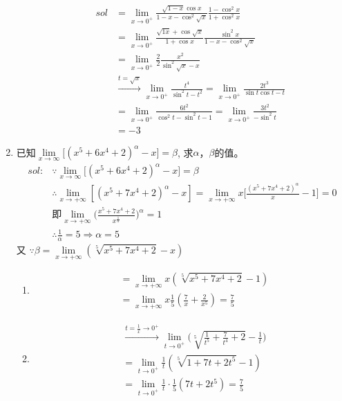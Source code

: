 \begin{enumerate}[{例}1.]
\begin{enumerate}[(1)]
                \begin{align*}
                    sol&=\lim_{x \to 0^+} \frac{\sqrt{1-x}\cos x}{1-x-\cos ^2 \sqrt{x}}\frac{1-\cos ^2 x}{1+\cos ^2 x}\\
                       &=\lim_{x \to 0^+}\frac{\sqrt{1x}+\cos \sqrt{x}}{1+\cos x}\frac{\sin ^2 x}{1-x-\cos ^2 \sqrt{x}}\\
                       &=\lim_{x \to 0^+}\frac{2}{2} \frac{x^2}{\sin ^2 \sqrt{x}-x}\\
                       &\xrightarrow{t=\sqrt{x}}\lim_{x \to 0^+}\frac{t^4}{\sin ^2 t-t^2}
                       =\lim_{x \to 0^+}\frac{2t^3}{\sin t \cos t-t}\\
                       &=\lim_{x \to 0^+}\frac{6t^2}{\cos ^2 t-\sin ^2 t -1}
                        =\lim_{x \to 0^+}\frac{3t^2}{-\sin ^2 t}\\
                       &=-3
                \end{align*}
        \end{enumerate}
    \item 已知$\lim\limits_{x\to\infty}\Big[(x^5+6x^4+2)^\alpha-x\Big]=\beta$, 求$\alpha$，$\beta$的值。
        \begin{align*}
            sol:&\because \lim\limits_{x\to\infty}\Big[(x^5+6x^4+2)^\alpha-x\Big]=\beta\\
            &\therefore \lim_{x \to +\infty}[(x^5+7x^4+2)^{\alpha}-x]=\lim_{x \to +\infty}x\bigg[\frac{(x^5+7x^4+2)^{\alpha}}{x}-1\bigg]=0\\
            &\mbox{即}\lim_{x \to +\infty}\bigg(\frac{x^5+7x^4+2}{x^{\frac{1}{\alpha}}}\bigg)^\alpha =1\\
            &\therefore \frac{1}{\alpha}=5 \Rightarrow \alpha=5
        \end{align*}
            又 $\because \beta=\lim\limits_{x \to +\infty}(\sqrt[5]{x^5+7x^4+2}-x)$
        \begin{enumerate}[$1^\circ$]
            \item 
                \begin{align*}
                    &=\lim_{x \to +\infty}x(\sqrt[5]{x^5+7x^4+2}-1)\\
                    &=\lim_{x \to +\infty}x\frac{1}{5}(\frac{7}{x}+\frac{2}{x^5})=\frac{7}{5}
                \end{align*}
            \item 
                \begin{align*}
                    &\xrightarrow{t=\frac{1}{x}\to 0^+}\lim_{t \to 0^+}\bigg(\sqrt[5]{\frac{1}{t^5}+\frac{7}{t^4}+2}-\frac{1}{t}\bigg)\\
                    &=\lim_{t \to 0^+} \frac{1}{t}(\sqrt[5]{1+7t+2t^5}-1)\\
                    &=\lim_{t \to 0^+} \frac{1}{t}\cdot\frac{1}{5}(7t+2t^5)=\frac{7}{5}
                \end{align*}
        \end{enumerate}


\end{enumerate}
